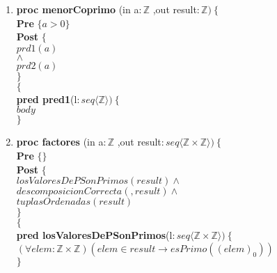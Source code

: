 \documentclass[a4paper]{article}
\begin{document}
\begin{enumerate}[label=\alph*)]
		\item
		
			\textbf{proc menorCoprimo }(in a$:\mathbb{Z}$
				,out result$:\mathbb{Z} )\ \{$\smallskip \\
			\hspace*{6mm} \textbf{Pre }$\{a>0 \}$\smallskip \\
			\hspace*{6mm} \textbf{Post }$\{$\\
			\hspace*{6mm} $prd1(a)$\\
			\hspace*{6mm} $\wedge$\\
			\hspace*{6mm} $prd2(a)$\\
			\hspace*{6mm} $\}$\\
			$\{$\smallskip \\
			
			\textbf{pred pred1}(l$: seq\langle \mathbb{Z}\rangle)\ \{$\smallskip \\
			\hspace*{6mm}$body$\\
			$\}$	
			
		\item 
			
			\textbf{proc factores }(in a$:\mathbb{Z}$
				,out result$:seq\langle \mathbb{Z} \times \mathbb{Z}\rangle )\ \{$\smallskip \\
			\hspace*{6mm} \textbf{Pre }$\{ \}$\smallskip \\
			\hspace*{6mm} \textbf{Post }$\{$\\
			\hspace*{6mm} $losValoresDePSonPrimos(result)\wedge$\\
			\hspace*{6mm} $descomposicionCorrecta(,result)\wedge$\\
			\hspace*{6mm} $tuplasOrdenadas(result)$\\
			\hspace*{6mm} $\}$\\
			$\{$\smallskip \\
			
			\textbf{pred losValoresDePSonPrimos}(l$:seq\langle \mathbb{Z} \times \mathbb{Z}
			\rangle)\ \{$\smallskip \\
			\hspace*{6mm}$(\forall elem:\mathbb{Z}\times \mathbb{Z})
				(elem\in result\rightarrow esPrimo((elem)_0))$\\
			$\}$\smallskip \\
			

\end{enumerate}
\end{document}
